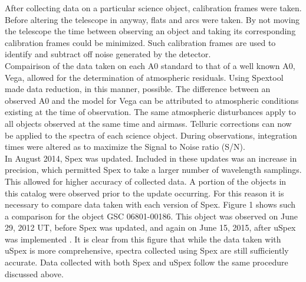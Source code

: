 After collecting data on a particular science object, calibration frames were taken.  Before altering the telescope in anyway, flats and arcs were taken.  By not moving the telescope the time between observing an object and taking its corresponding calibration frames could be minimized.  Such calibration frames are used to identify and subtract off noise generated by the detector.\\



Compairison of the data taken on each A0 standard to that of a well known A0, Vega, allowed for the determination of atmospheric residuals.  Using Spextool made data reduction, in this manner, possible.  The difference between an observed A0 and the model for Vega can be attributed to atmospheric conditions existing at the time of observation.  The same atmospheric disturbances apply to all objects observed at the same time and airmass.  Telluric corrections can now be applied to the spectra of each science object.  During observations, integration times were altered as to maximize the Signal to Noise ratio (S/N). \cite{Cushing_2004}\\


In August 2014, Spex was updated.  Included in these updates was an increase in precision, which permitted Spex to take a larger number of  wavelength samplings.  This allowed for higher accuracy of collected data.  A portion of the objects in this catalog were observed prior to the update occurring.  For this reason it is necessary to compare data taken with each version of Spex. Figure 1 shows such a comparison for the object GSC 06801-00186.  This object was observed on June 29, 2012 UT, before Spex was updated, and again on June 15, 2015, after uSpex was implemented \cite{Spextool_Manual_Cushing_2015}.  It is clear from this figure that while the data taken with uSpex is more comprehensive, spectra collected using Spex are still sufficiently accurate.  Data collected with both Spex and uSpex follow the same procedure discussed above.\\


